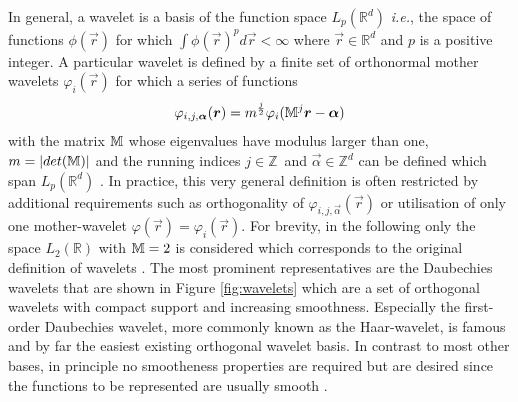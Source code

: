 {%
In general, a wavelet is a basis of the function space $L_p(\mathbb{R}^d)$ \textit{i.e.}, the space of functions $\phi(\vec{r})$ for which $\int \phi(\vec{r})^p d\vec{r}<\infty$ where $\vec{r}\in\mathbb{R}^d$ and $p$ is a positive integer.
A particular wavelet is defined by a finite set of orthonormal mother wavelets $\varphi_i(\vec{r})$ for which a series of functions
\begin{equation} \label{eq:waveBasis}
\varphi_{i,j,\bm{\alpha}}(\bm{r})=m^{\frac{j}{2}} \varphi_i(\mathbb{M}^j\bm{r}-\bm{\alpha})
\end{equation}
with the matrix $\mathbb{M}$ whose eigenvalues have modulus larger than one, %
$m=|det(\mathbb{M})|$ and the running indices $j\in \mathbb{Z}\,$ and $\vec{\alpha}\in \mathbb{Z}^d$ can be defined which span $L_p(\mathbb{R}^d)$ \cite{dahlke}.
In practice, this very general definition is often restricted by additional requirements such as orthogonality of $\varphi_{i,j,\vec{\alpha}}(\vec{r})$ or utilisation of only one mother-wavelet $\varphi(\vec{r})=\varphi_i(\vec{r})$.
For brevity, in the following only the space $L_2(\mathbb{R})$ with $\mathbb{M}=2$ is considered which corresponds to the original definition of wavelets \cite{Tasche}.
The most prominent representatives are the Daubechies wavelets that are shown in Figure \ref{fig:wavelets} which are a set of orthogonal wavelets with compact support and increasing smoothness.
Especially the first-order Daubechies wavelet, more commonly known as the Haar-wavelet, is famous and by far the easiest existing orthogonal wavelet basis.
In contrast to most other bases, in principle no smootheness properties are required but are desired since the functions to be represented are usually smooth \cite{daubechies}.
}
